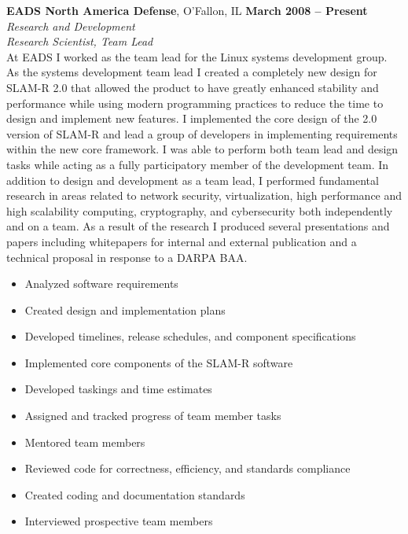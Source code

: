 \documentclass[margin,line]{resume}
\begin{document}
\begin{resume}
\textbf{EADS North America Defense}, O'Fallon, IL \hfill \textbf{March 2008 -- Present}\vspace{1mm}\\\vspace{1mm}%
\textit{\small{Research and Development}}\vspace{1mm}\\\vspace{0mm}%
\textsl{Research Scientist, Team Lead}\\
At EADS I worked as the team lead for the Linux systems development group. As
the systems development team lead I created a completely new design for SLAM-R
2.0 that allowed the product to have greatly enhanced stability and performance
while using modern programming practices to reduce the time to design and
implement new features.  I implemented the core design of the 2.0 version of
SLAM-R and lead a group of developers in implementing requirements within the
new core framework. I was able to perform both team lead and design tasks while
acting as a fully participatory member of the development team. In addition to
design and development as a team lead, I performed fundamental research in
areas related to network security, virtualization, high performance and high
scalability computing, cryptography, and cybersecurity both independently and on
a team. As a result of the research I produced several presentations and papers
including whitepapers for internal and external publication and a technical
proposal in response to a DARPA BAA.
\vspace{1mm}\\\vspace{0mm}
\begin{itemize}
\item Analyzed software requirements
\item Created design and implementation plans
\item Developed timelines, release schedules, and component specifications
\item Implemented core components of the SLAM-R software
\item Developed taskings and time estimates
\item Assigned and tracked progress of team member tasks
\item Mentored team members
\item Reviewed code for correctness, efficiency, and standards compliance
\item Created coding and documentation standards
\item Interviewed prospective team members

\end{itemize}
\end{resume}
\end{document}
